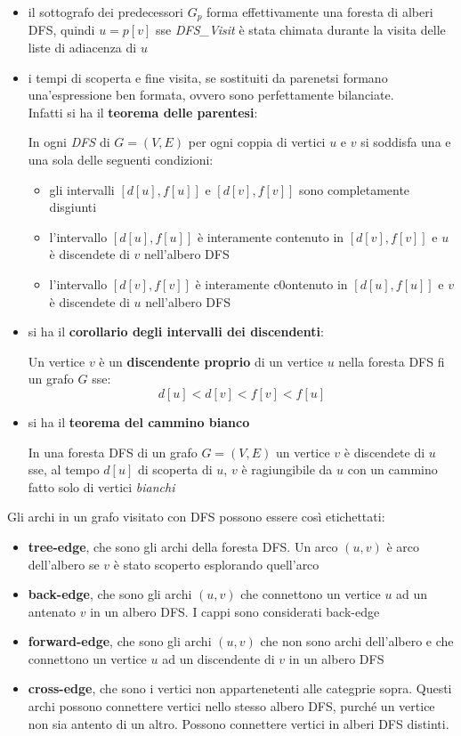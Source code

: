 \documentclass[a4paper,12pt, oneside]{book}
\begin{document}
\begin{itemize}
  \item il sottografo dei predecessori $G_p$ forma effettivamente una
  foresta di alberi DFS, quindi $u=p[v]$ sse \textit{DFS\_Visit} è
  stata chimata durante la visita delle liste di adiacenza di $u$
  \item i tempi di scoperta e fine visita, se sostituiti da parenetsi
  formano una'espressione ben formata, ovvero sono perfettamente
  bilanciate.
  \\ Infatti si ha il \textbf{teorema delle parentesi}:
  \begin{teorema}
    In ogni \textit{DFS} di $G=(V,E)$ per ogni coppia di vertici $u$ e
    $v$ si soddisfa una e una sola delle seguenti condizioni:
    \begin{itemize}
      \item gli intervalli $[d[u],f[u]]$ e $[d[v],f[v]]$ sono
      completamente disgiunti
      \item l'intervallo $[d[u],f[u]]$ è interamente contenuto in
      $[d[v],f[v]]$ e $u$ è discendete di $v$ nell'albero DFS
      \item l'intervallo $[d[v],f[v]]$ è interamente c0ontenuto in
      $[d[u],f[u]]$ e $v$ è discendete di $u$ nell'albero DFS
    \end{itemize}
  \end{teorema}
  \item si ha il \textbf{corollario degli intervalli dei
    discendenti}:
  \begin{corollario}
    Un vertice $v$ è un \textbf{discendente proprio} di un vertice $u$ nella
    foresta DFS fi un grafo $G$ sse:
    \[d[u]<d[v]<f[v]<f[u]\]
  \end{corollario}
  \item si ha il \textbf{teorema del cammino bianco}
  \begin{teorema}
    In una foresta DFS di un grafo $G=(V,E)$ un vertice $v$ è
    discendete di $u$ sse, al tempo $d[u]$ di scoperta di $u$, $v$ è
    ragiungibile da $u$ con un cammino fatto solo di vertici
    \textit{bianchi} 
  \end{teorema} 
\end{itemize}
Gli archi in un grafo visitato con DFS possono essere così
etichettati:
\begin{itemize}
  \item \textbf{tree-edge}, che sono gli archi della foresta DFS. Un
  arco $(u,v)$ è arco dell'albero se $v$ è stato scoperto esplorando
  quell'arco 
  \item \textbf{back-edge}, che sono gli archi $(u,v)$ che connettono
  un vertice $u$ ad un antenato $v$ in un albero DFS. I cappi sono
  considerati back-edge
  \item \textbf{forward-edge}, che sono gli archi $(u,v)$ che non sono
  archi dell'albero e che connettono un vertice $u$ ad un discendente
  di $v$ in un albero DFS
  \item \textbf{cross-edge}, che sono i vertici non appartenetenti
  alle categprie sopra. Questi archi possono connettere vertici nello
  stesso albero DFS, purché un vertice non sia antento di un
  altro. Possono connettere vertici in alberi DFS distinti.
\end{itemize}
\end{document}
